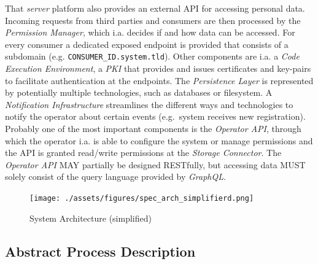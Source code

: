 \documentclass[12pt,english,a4paper,titlepage,cleardoublepage=empty,dottedtoc]{report}
\begin{document}
That \emph{server} platform also provides an external API for accessing
personal data. Incoming requests from third parties and consumers are
then processed by the \emph{Permission Manager}, which i.a. decides if
and how data can be accessed. For every consumer a dedicated exposed
endpoint is provided that consists of a subdomain (e.g.
\texttt{CONSUMER\_ID.system.tld}). Other components are i.a. a
\emph{Code Execution Environment}, a \emph{PKI} that provides and issues
certificates and key-pairs to facilitate authentication at the
endpoints. The \emph{Persistence Layer} is represented by potentially
multiple technologies, such as databases or filesystem. A
\emph{Notification Infrastructure} streamlines the different ways and
technologies to notify the operator about certain events (e.g.~system
receives new registration). Probably one of the most important
components is the \emph{Operator API}, through which the operator i.a.
is able to configure the system or manage permissions and the API is
granted read/write permissions at the \emph{Storage Connector}. The
\emph{Operator API} MAY partially be designed RESTfully, but accessing
data MUST solely consist of the query language provided by
\emph{GraphQL}.

\begin{figure}
\centering
\texttt{[image: ./assets/figures/spec\_arch\_simplifierd.png]}
\caption{System Architecture
(simplified)\label{fig:spec_arch_simplifier}}
\end{figure}

\subsection{Abstract Process
Description}\label{abstract-process-description}
\end{document}
